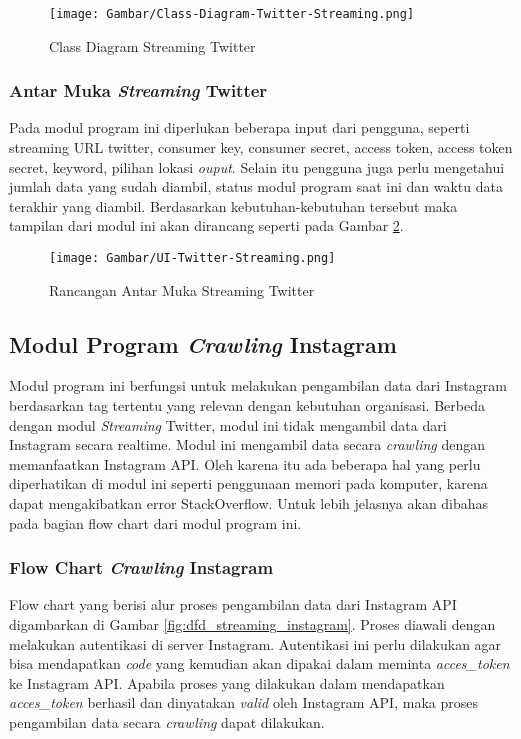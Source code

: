 \begin{figure}[H]
	\centering
	\texttt{[image: Gambar/Class-Diagram-Twitter-Streaming.png]}
	\caption[Class Diagram Streaming Twitter]{Class Diagram Streaming Twitter} 
	\label{fig:class_streaming_twitter}
\end{figure}

\subsubsection{Antar Muka \textit{Streaming} Twitter}
Pada modul program ini diperlukan beberapa input dari pengguna, seperti streaming URL twitter, consumer key, consumer secret, access token, access token secret, keyword, pilihan lokasi \textit{ouput}. Selain itu pengguna juga perlu mengetahui jumlah data yang sudah diambil, status modul program saat ini dan waktu data terakhir yang diambil. Berdasarkan kebutuhan-kebutuhan tersebut maka tampilan dari modul ini akan dirancang seperti pada Gambar \ref{fig:ui_streaming_twitter}.

\begin{figure}[H]
	\centering
	\texttt{[image: Gambar/UI-Twitter-Streaming.png]}
	\caption[Rancangan Antar Muka Streaming Twitter]{Rancangan Antar Muka Streaming Twitter} 
	\label{fig:ui_streaming_twitter}
\end{figure}

\subsection{Modul Program \textit{Crawling} Instagram}
Modul program ini berfungsi untuk melakukan pengambilan data dari Instagram berdasarkan tag tertentu yang relevan dengan kebutuhan organisasi. Berbeda dengan modul \textit{Streaming} Twitter, modul ini tidak mengambil data dari Instagram secara realtime. Modul ini mengambil data secara \textit{crawling} dengan memanfaatkan Instagram API. Oleh karena itu ada beberapa hal yang perlu diperhatikan di modul ini seperti penggunaan memori pada komputer, karena dapat mengakibatkan error StackOverflow. Untuk lebih jelasnya akan dibahas pada bagian flow chart dari modul program ini.

\subsubsection{Flow Chart \textit{Crawling} Instagram}
\label{sec:dfd_streaming_instagram}
Flow chart yang berisi alur proses pengambilan data dari Instagram API digambarkan di Gambar \ref{fig:dfd_streaming_instagram}. Proses diawali dengan melakukan autentikasi di server Instagram. Autentikasi ini perlu dilakukan agar bisa mendapatkan \textit{code} yang kemudian akan dipakai dalam meminta \textit{acces\_token} ke Instagram API. Apabila proses yang dilakukan dalam mendapatkan \textit{acces\_token} berhasil dan dinyatakan \textit{valid} oleh Instagram API, maka proses pengambilan data secara \textit{crawling} dapat dilakukan.

